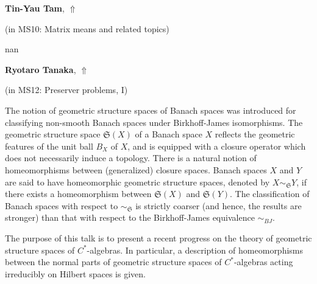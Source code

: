 \documentclass[ILAS2025-program.tex]{subfiles}
\begin{document}
\hypertarget{down0255}{}\begin{ilasabstract}
    
\textbf{Tin-Yau Tam},  \hfill \hyperlink{up0255}{$\Uparrow$}
    
    
(in {\color{mstitle}MS10: Matrix means and related topics})
        
\mtskip
    nan
\end{ilasabstract}
    

\hypertarget{down0162}{}\begin{ilasabstract}
    
\textbf{Ryotaro Tanaka},  \hfill \hyperlink{up0162}{$\Uparrow$}
    
    
(in {\color{mstitle}MS12: Preserver problems, I})
        
\mtskip
    The notion of geometric structure spaces of Banach spaces was introduced for classifying non-smooth Banach spaces under Birkhoff-James isomorphisms. The geometric structure space $\mathfrak{S}(X)$ of a Banach space $X$ reflects the geometric features of the unit ball $B_X$ of $X$, and is equipped with a closure operator which does not necessarily induce a topology. There is a natural notion of homeomorphisms between (generalized) closure spaces. Banach spaces $X$ and $Y$ are said to have homeomorphic geometric structure spaces, denoted by $X\sim_\mathfrak{S} Y$, if there exists a homeomorphism between $\mathfrak{S} (X)$ and $\mathfrak{S} (Y)$. The classification of Banach spaces with respect to $\sim_\mathfrak{S}$ is strictly coarser (and hence, the results are stronger) than that with respect to the Birkhoff-James equivalence $\sim_{BJ}$.

The purpose of this talk is to present a recent progress on the theory of geometric structure spaces of $C^*$-algebras. In particular, a description of homeomorphisms between the normal parts of geometric structure spaces of $C^*$-algebras acting irreducibly on Hilbert spaces is given.

\end{ilasabstract}
    
\end{document}
